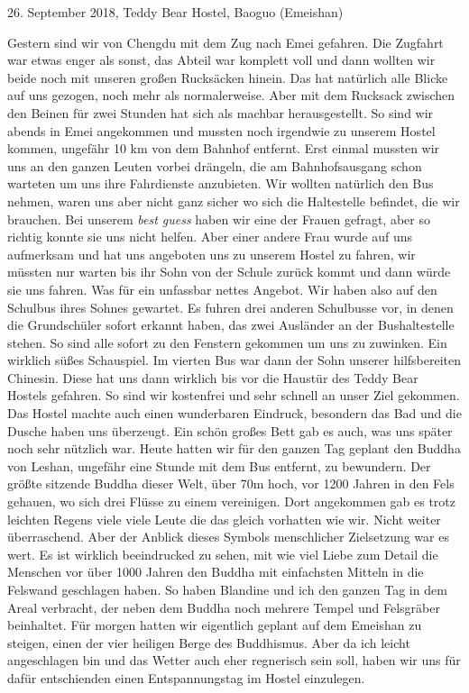 \documentclass[11pt]{book}
\begin{document}
26. September 2018, Teddy Bear Hostel, Baoguo (Emeishan)

Gestern sind wir von Chengdu mit dem Zug nach Emei gefahren. Die Zugfahrt war etwas enger als sonst, das Abteil 
war komplett voll und dann wollten wir beide noch mit unseren großen Rucksäcken hinein. Das hat natürlich alle 
Blicke auf uns gezogen, noch mehr als normalerweise. Aber mit dem Rucksack zwischen den Beinen für zwei Stunden 
hat sich als machbar herausgestellt. So sind wir abends in Emei angekommen und mussten noch irgendwie zu unserem 
Hostel kommen, ungefähr 10 km von dem Bahnhof entfernt. Erst einmal mussten wir uns an den ganzen Leuten vorbei 
drängeln, die am Bahnhofsausgang schon warteten um uns ihre Fahrdienste anzubieten. Wir wollten natürlich den Bus 
nehmen, waren uns aber nicht ganz sicher wo sich die Haltestelle befindet, die wir brauchen. Bei unserem \emph{best guess} 
haben wir eine der Frauen gefragt, aber so richtig konnte sie uns nicht helfen. Aber einer andere Frau wurde auf 
uns aufmerksam und hat uns angeboten uns zu unserem Hostel zu fahren, wir müssten nur warten bis ihr Sohn von der 
Schule zurück kommt und dann würde sie uns fahren. Was für ein unfassbar nettes Angebot. Wir haben also auf den 
Schulbus ihres Sohnes gewartet. Es fuhren drei anderen Schulbusse vor, in denen die Grundschüler sofort erkannt haben, 
das zwei Ausländer an der Bushaltestelle stehen. So sind alle sofort zu den Fenstern gekommen um uns zu zuwinken. 
Ein wirklich süßes Schauspiel. Im vierten Bus war dann der Sohn unserer hilfsbereiten Chinesin. Diese hat uns dann 
wirklich bis vor die Haustür des Teddy Bear Hostels gefahren. So sind wir kostenfrei und sehr schnell an unser Ziel gekommen.
Das Hostel machte auch einen wunderbaren Eindruck, besondern das Bad und die Dusche haben uns überzeugt. Ein schön 
großes Bett gab es auch, was uns später noch sehr nützlich war.
Heute hatten wir für den ganzen Tag geplant den Buddha von Leshan, ungefähr eine Stunde mit dem Bus entfernt, 
zu bewundern. Der größte sitzende Buddha dieser Welt, über 70m hoch, vor 1200 Jahren in den Fels gehauen, wo sich 
drei Flüsse zu einem vereinigen. Dort angekommen gab es trotz leichten Regens viele viele Leute die das gleich 
vorhatten wie wir. Nicht weiter überraschend. Aber der Anblick dieses Symbols menschlicher Zielsetzung war es wert. 
Es ist wirklich beeindrucked zu sehen, mit wie viel Liebe zum Detail die Menschen vor über 1000 Jahren den Buddha 
mit einfachsten Mitteln in die Felswand geschlagen haben. So haben Blandine und ich den ganzen Tag in dem Areal 
verbracht, der neben dem Buddha noch mehrere Tempel und Felsgräber beinhaltet. Für morgen hatten wir eigentlich 
geplant auf dem Emeishan zu steigen, einen der vier heiligen Berge des Buddhismus. Aber da ich leicht angeschlagen 
bin und das Wetter auch eher regnerisch sein soll, haben wir uns für dafür entschienden einen Entspannungstag im 
Hostel einzulegen.
\end{document}
